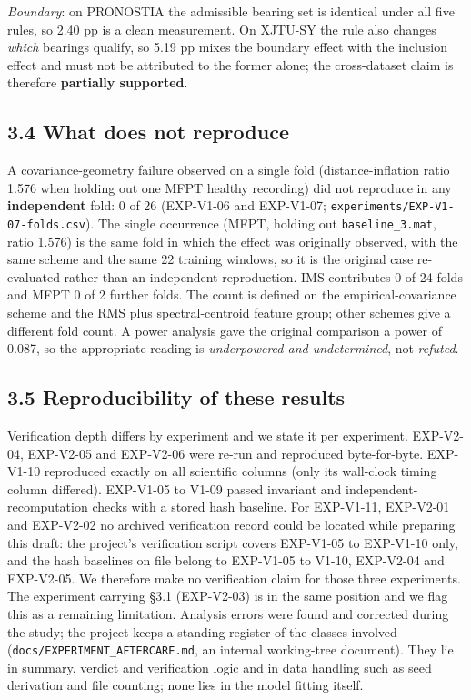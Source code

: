 \documentclass[11pt]{article}
\newcommand{\code}[1]{\texttt{#1}}
\begin{document}
\emph{Boundary}: on PRONOSTIA the admissible bearing set is identical under all five rules, so 2.40 pp is a clean measurement. On XJTU-SY the rule also changes \emph{which} bearings qualify, so 5.19 pp mixes the boundary effect with the inclusion effect and must not be attributed to the former alone; the cross-dataset claim is therefore \textbf{partially supported}.

\subsection{3.4 What does not reproduce}

A covariance-geometry failure observed on a single fold (distance-inflation ratio 1.576 when holding out one MFPT healthy recording) did not reproduce in any \textbf{independent} fold: 0 of 26 (EXP-V1-06 and EXP-V1-07; \code{experiments/EXP-V1-07-folds.csv}). The single occurrence (MFPT, holding out \code{baseline\_3.mat}, ratio 1.576) is the same fold in which the effect was originally observed, with the same scheme and the same 22 training windows, so it is the original case re-evaluated rather than an independent reproduction. IMS contributes 0 of 24 folds and MFPT 0 of 2 further folds. The count is defined on the empirical-covariance scheme and the RMS plus spectral-centroid feature group; other schemes give a different fold count. A power analysis gave the original comparison a power of 0.087, so the appropriate reading is \emph{underpowered and undetermined}, not \emph{refuted}.

\subsection{3.5 Reproducibility of these results}

Verification depth differs by experiment and we state it per experiment. EXP-V2-04, EXP-V2-05 and EXP-V2-06 were re-run and reproduced byte-for-byte. EXP-V1-10 reproduced exactly on all scientific columns (only its wall-clock timing column differed). EXP-V1-05 to V1-09 passed invariant and independent-recomputation checks with a stored hash baseline. For EXP-V1-11, EXP-V2-01 and EXP-V2-02 no archived verification record could be located while preparing this draft: the project's verification script covers EXP-V1-05 to EXP-V1-10 only, and the hash baselines on file belong to EXP-V1-05 to V1-10, EXP-V2-04 and EXP-V2-05. We therefore make no verification claim for those three experiments. The experiment carrying \S3.1 (EXP-V2-03) is in the same position and we flag this as a remaining limitation. Analysis errors were found and corrected during the study; the project keeps a standing register of the classes involved (\code{docs/EXPERIMENT\_AFTERCARE.md}, an internal working-tree document). They lie in summary, verdict and verification logic and in data handling such as seed derivation and file counting; none lies in the model fitting itself.
\end{document}
